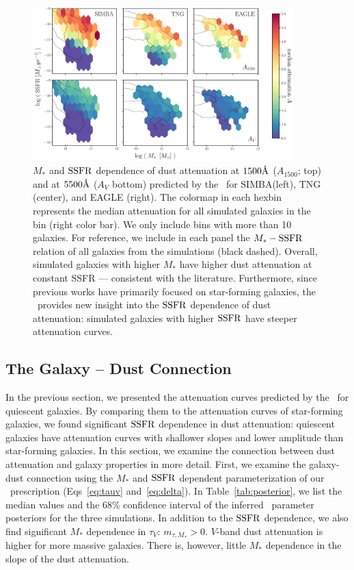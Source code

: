 \begin{figure}
\begin{center}
    \includegraphics[width=0.9\textwidth]{figs/abc_av_mssfr.pdf}
    \caption{\label{fig:avmsfr}
        $M_*$ and ${\rm SSFR}$ dependence of dust attenuation at $1500 \AA$
        ($A_{1500}$; top) and at $5500\AA$ ($A_{V}$ bottom) predicted by the
        \eda~for SIMBA(left), TNG (center), and EAGLE (right). The colormap in each hexbin 
        represents the median attenuation for all simulated galaxies in the
        bin (right color bar). We only include bins with more than 10 galaxies.
        For reference, we include in each panel the $M_*-{\rm SSFR}$ relation of
        all galaxies from the simulations (black dashed).
        Overall, simulated galaxies with higher $M_*$ have higher dust
        attenuation at constant SSFR --- consistent with the literature.
        Furthermore, since previous works have primarily focused on star-forming
        galaxies, the \eda~provides new insight into the ${\rm SSFR}$ dependence of
        dust attenuation: simulated galaxies with higher ${\rm SSFR}$ have steeper
        attenuation curves. 
    }
\end{center}
\end{figure}

\subsection{The Galaxy -- Dust Connection}  
In the previous section, we presented the attenuation curves predicted by
the \eda~for quiescent galaxies. 
By comparing them to the attenuation curves of star-forming galaxies, we
found significant ${\rm SSFR}$ dependence in dust attenuation: quiescent galaxies
have attenuation curves with shallower slopes and lower amplitude than
star-forming galaxies. 
In this section, we examine the connection between dust attenuation and galaxy
properties in more detail. 
First, we examine the galaxy-dust connection using the $M_*$ and ${\rm SSFR}$
dependent parameterization of our
\eda~prescription (Eqs~\ref{eq:tauv} and~\ref{eq:delta}).
In Table~\ref{tab:posterior}, we list the median values and the 68\%
confidence interval of the inferred \eda~parameter posteriors for the 
three simulations. 
In addition to the ${\rm SSFR}$ dependence, we also find
significant $M_*$ dependence in $\tau_V$: $m_{\tau,M_*} > 0$.
$V$-band dust attenuation is higher for more massive galaxies.  
There is, however, little $M_*$ dependence in the slope of the dust
attenuation.

